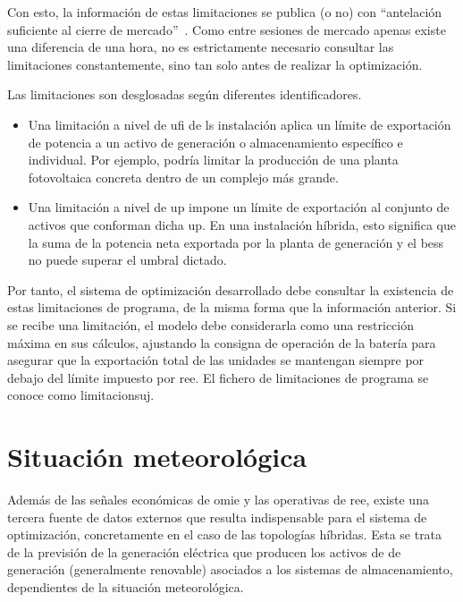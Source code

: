 Con esto, la información de estas limitaciones se publica (o no) con ``antelación suficiente al cierre de mercado''~\cite{mte2019resolucion}. Como entre sesiones de mercado apenas existe una diferencia de una hora, no es estrictamente necesario consultar las limitaciones constantemente, sino tan solo antes de realizar la optimización.

Las limitaciones son desglosadas según diferentes identificadores.

\begin{itemize}

  \item Una limitación a nivel de \gls{ufi} de ls instalación aplica un límite de exportación de potencia a un activo de generación o almacenamiento específico e individual. Por ejemplo, podría limitar la producción de una planta fotovoltaica concreta dentro de un complejo más grande.

  \item Una limitación a nivel de \gls{up} impone un límite de exportación al conjunto de activos que conforman dicha \gls{up}. En una instalación híbrida, esto significa que la suma de la potencia neta exportada por la planta de generación y el \gls{bess} no puede superar el umbral dictado.

\end{itemize}

Por tanto, el sistema de optimización desarrollado debe consultar la existencia de estas limitaciones de programa, de la misma forma que la información anterior. Si se recibe una limitación, el modelo debe considerarla como una restricción máxima en sus cálculos, ajustando la consigna de operación de la batería para asegurar que la exportación total de las unidades se mantengan siempre por debajo del límite impuesto por \gls{ree}. El fichero de limitaciones de programa se conoce como \gls{limitacionsuj}.

\section{Situación meteorológica}
\label{makereference4.3}

Además de las señales económicas de \gls{omie} y las operativas de \gls{ree}, existe una tercera fuente de datos externos que resulta indispensable para el sistema de optimización, concretamente en el caso de las topologías híbridas. Esta se trata de la previsión de la generación eléctrica que producen los activos de de generación (generalmente renovable) asociados a los sistemas de almacenamiento, dependientes de la situación meteorológica.

